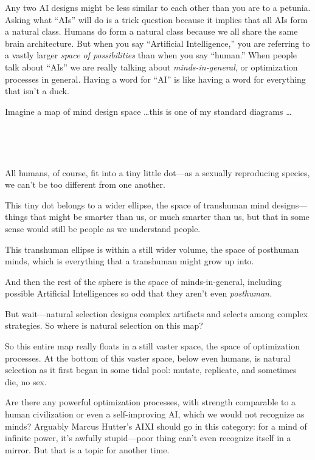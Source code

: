 {
 Any two AI designs might be less similar to each other than you
are to a petunia. Asking what
``AIs'' will do is a trick question
because it implies that all AIs form a natural class. Humans do form a
natural class because we all share the same brain architecture. But
when you say ``Artificial
Intelligence,'' you are referring to a vastly larger
\textit{space of possibilities} than when you say
``human.'' When people talk about
``AIs'' we are really talking about
\textit{minds-in-general}, or optimization processes in general. Having
a word for ``AI'' is like having a
word for everything that isn't a duck.}

{
 Imagine a map of mind design space \ldots this is one of my
standard diagrams \ldots}

{
 ~}

{\centering
{}

\par}


\bigskip

{
 ~}

{
 All humans, of course, fit into a tiny little dot---as a sexually
reproducing species, we can't be too different from one
another.}

{
 This tiny dot belongs to a wider ellipse, the space of transhuman
mind designs---things that might be smarter than us, or much smarter
than us, but that in some sense would still be people as we understand
people.}

{
 This transhuman ellipse is within a still wider volume, the space
of posthuman minds, which is everything that a transhuman might grow up
into.}

{
 And then the rest of the sphere is the space of minds-in-general,
including possible Artificial Intelligences so odd that they
aren't even \textit{posthuman.}}

{
 But wait---natural selection designs complex artifacts and selects
among complex strategies. So where is natural selection on this map?}

{
 So this entire map really floats in a still vaster space, the
space of optimization processes. At the bottom of this vaster space,
below even humans, is natural selection as it first began in some tidal
pool: mutate, replicate, and sometimes die, no sex.}

{
 Are there any powerful optimization processes, with strength
comparable to a human civilization or even a self-improving AI, which
we would not recognize as minds? Arguably Marcus
Hutter's AIXI should go in this category: for a mind of
infinite power, it's awfully stupid---poor thing
can't even recognize itself in a mirror. But that is a
topic for another time.}

